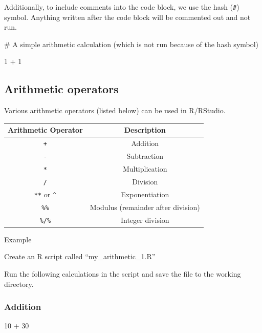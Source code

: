 \documentclass[
  letterpaper,
  DIV=11,
  numbers=noendperiod]{scrreprt}
\newenvironment{Shaded}{}{}
\newcommand{\CommentTok}[1]{\textcolor[rgb]{0.42,0.45,0.49}{#1}}
\newcommand{\DecValTok}[1]{\textcolor[rgb]{0.00,0.36,0.77}{#1}}
\newcommand{\SpecialCharTok}[1]{\textcolor[rgb]{0.00,0.36,0.77}{#1}}
\begin{document}
Additionally, to include comments into the code block, we use the hash
(\texttt{\#}) symbol. Anything written after the code block will be
commented out and not run.

\begin{Shaded}
\begin{Highlighting}[]
\CommentTok{\# A simple arithmetic calculation (which is not run because of the hash symbol)}

\DecValTok{1} \SpecialCharTok{+} \DecValTok{1}
\end{Highlighting}
\end{Shaded}

\subsection{Arithmetic operators}\label{arithmetic-operators}

Various arithmetic operators (listed below) can be used in R/RStudio.

\begin{longtable}[]{@{}cc@{}}
\toprule\noalign{}
Arithmetic Operator & Description \\
\midrule\noalign{}
\endhead
\bottomrule\noalign{}
\endlastfoot
\texttt{+} & Addition \\
\texttt{-} & Subtraction \\
\texttt{*} & Multiplication \\
\texttt{/} & Division \\
\texttt{**} or \texttt{\^{}} & Exponentiation \\
\texttt{\%\%} & Modulus (remainder after division) \\
\texttt{\%/\%} & Integer division \\
\end{longtable}

Example

Create an R script called ``my\_arithmetic\_1.R''

Run the following calculations in the script and save the file to the
working directory.

\subsubsection{Addition}\label{addition}

\begin{Shaded}
\begin{Highlighting}[]
\DecValTok{10} \SpecialCharTok{+} \DecValTok{30}
\end{Highlighting}
\end{Shaded}
\end{document}
